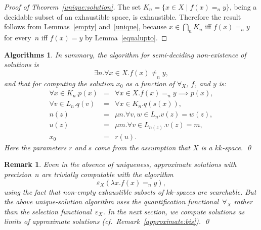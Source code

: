 \documentclass[10pt]{article}
\newtheorem{Algs}[cor]{Algorithms}
\newtheorem{Rem}[cor]{Remark}
\newenvironment{algorithms}{\begin{Algs}\em}{\end{Algs}}
\newenvironment{rem}{\begin{Rem}\em}{\end{Rem}}
\begin{document}
\begin{proof}[Proof of Theorem~\ref{unique:solution}]
  The set $K_n = \{ x \in X \mid f(x) =_n y\}$, being a decidable
  subset of an exhaustible space, is exhaustible.  Therefore the
  result follows from Lemmas~\ref{empty} and~\ref{unique}, because $x
  \in \bigcap_n K_n$ iff $f(x) =_n y$ for every~$n$ iff $f(x) = y$ by
  Lemma~\ref{equalupto}.
\end{proof}

\begin{algorithms} \label{solve}
  In summary, the algorithm for semi-deciding non-existence of
  solutions is
\[ 
\exists n.\forall x \in X.f(x) \ne_n y,
\]
and that for computing the solution $x_0$ as a function of
$\forall_X$, $f$, and $y$ is:
\begin{eqnarray*}
\forall x \in K_n.p(x) & = & \forall x \in X. f(x) =_n y \implies p(x), \\
\forall v \in L_n.q(v) & = & \forall x \in K_n. q(s(x)), \\
n(z) & = & \mu n.\forall v,w \in L_n.  v(z)=w(z), \\
u(z)& = & \mu m.  \forall v \in L_{n(z)}.  v(z)=m, \\
  x_0 & = & r(u).
\end{eqnarray*}
Here the parameters $r$ and $s$ come from the assumption that $X$ is a
$kk$-space. \qed
\end{algorithms}

\begin{rem} \label{approximate} Even in the absence of uniqueness,
  \emph{approximate} solutions with precision~$n$ are trivially
  computable with the algorithm
\[ 
    \varepsilon_X(\lambda x.f(x)=_n y), 
\] 
using the fact that non-empty exhaustible subsets of $kk$-spaces are
searchable. But the above unique-solution algorithm uses the
quantification functional~$\forall_X$ rather than the selection
functional~$\varepsilon_X$. In the next section, we compute solutions
as limits of approximate solutions (cf.\
Remark~\ref{approximate:bis}). \qed
\end{rem}
\end{document}
